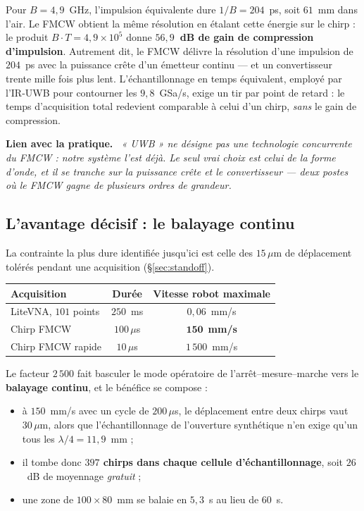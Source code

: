\documentclass[11pt,a4paper]{article}
\newenvironment{implication}%
  {\par\medskip\begin{lrbox}{\implbox}\begin{minipage}{0.95\textwidth}%
   \textbf{Lien avec la pratique.}\itshape\ }%
  {\end{minipage}\end{lrbox}\noindent\fbox{\usebox{\implbox}}\par\medskip}
\begin{document}
Pour $B = 4{,}9$~GHz, l'impulsion équivalente dure $1/B = 204$~ps, soit $61$~mm
dans l'air. Le FMCW obtient la même résolution en étalant cette énergie sur le
chirp : le produit $B\!\cdot\!T = 4{,}9\times10^5$ donne
\textbf{$56{,}9$~dB de gain de compression d'impulsion}. Autrement dit, le FMCW
délivre la résolution d'une impulsion de $204$~ps avec la puissance crête d'un
émetteur continu --- et un convertisseur trente mille fois plus lent.
L'échantillonnage en temps équivalent, employé par l'IR-UWB pour contourner les
$9{,}8$~GSa/s, exige un tir par point de retard : le temps d'acquisition total
redevient comparable à celui d'un chirp, \emph{sans} le gain de compression.

\begin{implication}
« UWB » ne désigne pas une technologie concurrente du FMCW : notre système
l'est déjà. Le seul vrai choix est celui de la forme d'onde, et il se tranche
sur la puissance crête et le convertisseur --- deux postes où le FMCW gagne de
plusieurs ordres de grandeur.
\end{implication}

\subsection{L'avantage décisif : le balayage continu}

La contrainte la plus dure identifiée jusqu'ici est celle des $15\,\mu$m de
déplacement tolérés pendant une acquisition (\S\ref{sec:standoff}).

\begin{table}[h]
\centering
\begin{tabular}{lcc}
\toprule
Acquisition & Durée & Vitesse robot maximale \\
\midrule
LiteVNA, $101$ points & $250$~ms & $0{,}06$~mm/s \\
Chirp FMCW & $100\,\mu$s & $\mathbf{150}$~\textbf{mm/s} \\
Chirp FMCW rapide & $10\,\mu$s & $1\,500$~mm/s \\
\bottomrule
\end{tabular}
\end{table}

Le facteur $2\,500$ fait basculer le mode opératoire de
l'arrêt--mesure--marche vers le \textbf{balayage continu}, et le bénéfice se
compose :

\begin{itemize}
\item à $150$~mm/s avec un cycle de $200\,\mu$s, le déplacement entre deux
      chirps vaut $30\,\mu$m, alors que l'échantillonnage de l'ouverture
      synthétique n'en exige qu'un tous les $\lambda/4 = 11{,}9$~mm ;
\item il tombe donc \textbf{$397$ chirps dans chaque cellule
      d'échantillonnage}, soit $26$~dB de moyennage \emph{gratuit} ;
\item une zone de $100 \times 80$~mm se balaie en $5{,}3$~s au lieu de $60$~s.
\end{itemize}
\end{document}

